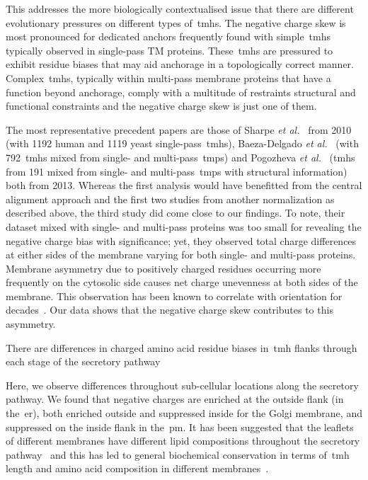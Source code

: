\begin{enumerate}[i]
 This addresses the more biologically contextualised issue that there are different evolutionary pressures on different types of~\gls{tmh}s.
The negative charge skew is most pronounced for dedicated anchors frequently found with simple~\gls{tmh}s typically observed in single-pass TM proteins.
These~\gls{tmh}s are pressured to exhibit residue biases that may aid anchorage in a topologically correct manner.
Complex~\gls{tmh}s, typically within multi-pass membrane proteins that have a function beyond anchorage, comply with a multitude of restraints structural and functional constraints and the negative charge skew is just one of them.
\end{enumerate}

The most representative precedent papers are those of Sharpe \textit{et al.}~\cite{Sharpe2010} from 2010 (with 1192 human and 1119 yeast single-pass~\gls{tmh}s), Baeza-Delgado \textit{et al.}~\cite{Baeza-Delgado2013} (with 792~\gls{tmh}s mixed from single- and multi-pass~\gls{tmp}s) and Pogozheva \textit{et al.}~\cite{Pogozheva2013} (\gls{tmh}s from 191 mixed from single- and multi-pass~\gls{tmp}s with structural information) both from 2013.
Whereas the first analysis would have benefitted from the central alignment approach and the first two studies from another normalization as described above, the third study did come close to our findings.
To note, their dataset mixed with single- and multi-pass proteins was too small for revealing the negative charge bias with significance; yet, they observed total charge differences at either sides of the membrane varying for both single- and multi-pass proteins.
Membrane asymmetry due to positively charged residues occurring more frequently on the cytosolic side causes net charge unevenness at both sides of the membrane.
This observation has been known to correlate with orientation for decades~\cite{VonHeijne1989, Baeza-Delgado2013, Meindl-Beinker2006}.
Our data shows that the negative charge skew contributes to this asymmetry.

There are differences in charged amino acid residue biases in~\gls{tmh} flanks through each stage of the secretory pathway

Here, we observe differences throughout sub-cellular locations along the secretory pathway.
We found that negative charges are enriched at the outside flank (in the~\gls{er}), both enriched outside and suppressed inside for the Golgi membrane, and suppressed on the inside flank in the~\gls{pm}.
It has been suggested that the leaflets of different membranes have different lipid compositions throughout the secretory pathway~\cite{VanMeer2008} and this has led to general biochemical conservation in terms of~\gls{tmh} length and amino acid composition in different membranes~\cite{Sharpe2010, Pogozheva2013}.

